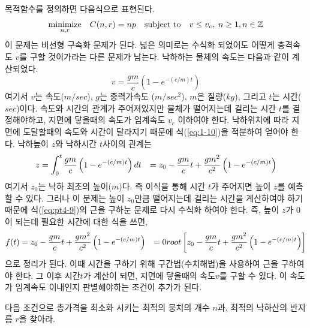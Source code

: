 \documentclass[a4,10pt]{article}
\theoremstyle{examplestyle}
\let\\\tabularnewline
\let\\\tabularnewline
\begin{document}
목적함수를 정의하면 다음식으로 표현된다.
\begin{equation*}
\begin{aligned}
& \underset{n,r}{\text{minimize}}
& & C(n,r) = np\\
& \text{subject to}
& & v \leq v_{c}, \; n \geq 1, n\in\mathbb{Z}
\end{aligned}
\end{equation*}
이 문제는 비선형 구속화 문제가 된다. 넓은 의미로는 수식화 되었어도 어떻게 충격속도 $v$를 구할 것이가라는 다른 문제가 남는다. 낙하하는 물체의 속도는 다음과 같이 계산되었다.
\begin{equation}\label{eq:1-10}
v=\frac{gm}{c}\left(1-e^{-(c/m)t}\right)
\end{equation}
여기서 $v$는 속도($m/sec$), $g$는 중력가속도 ($m/sec^2$), $m$은 질량($kg$), 그리고 $t$는 시간($sec$)이다. 속도와 시간의 관계가 주어져있지만 물체가 떨어지는데 걸리는 시간 $t$를 결정해야하고, 지면에 닿을때의 속도가 임계속도 $v_c$ 이하여야 한다. 낙하위치에 따라 지면에 도달할때의 속도와 시간이 달라지기 때문에 식(\ref{eq:1-10})을 적분하여 얻어야 한다. 낙하높이 $z$와 낙하시간 $t$사이의 관계는
\begin{align}
z&=\int_{0}^{t}\frac{gm}{c}\left(1-e^{-(c/m)t}\right)dt\\
&=z_{0}-\frac{gm}{c}t+\frac{gm^2}{c^2}\left(1-e^{-(c/m)t}\right)\label{eq:pt4-9}
\end{align}
여기서 $z_{0}$는 낙하 최초의 높이($m$)다. 즉 이식을 통해 시간 $t$가 주어지면 높이 $z$를 예측할 수 있다. 그러나 이 문제는 높이 $z_{0}$만큼 떨어지는데 걸리는 시간을 계산하여야 하기 때문에 식(\ref{eq:pt4-9})의 근을 구하눈 문제로 다시 수식화 하여야 한다. 즉, 높이 $z$가 $0$이 되는데 필요한 시간에 대한 식을 쓰면,
\begin{align}
f(t)&=z_{0}-\frac{gm}{c}t+\frac{gm^2}{c^2}\left(1-e^{-(c/m)t}\right)\label{eq:pt4-10}\\
&=0\\
root\left[z_{0}-\frac{gm}{c}t+\frac{gm^2}{c^2}\left(1-e^{-(c/m)t}\right)\right]
\end{align}
으로 정리가 된다. 이때 시간을 구하기 위해 구간법(수치해법)을 사용하여 근을 구하여야 한다. 그 이후 시간$t$가 계산이 되면, 지면에 닿을때의 속도$v$를 구할 수 있다. 이 속도가 임계속도 이내인지 판별해야하는 조건이 추가가 된다.\\

다음 조건으로 총가격을 최소화 시키는 최적의 뭉치의 개수 $n$과, 최적의 낙하산의 반지름 $r$을 찾아라.
\end{document}
